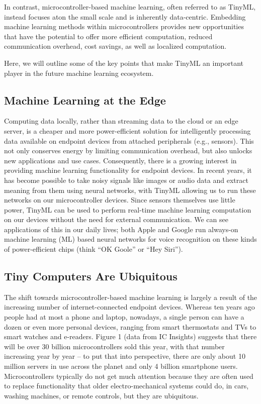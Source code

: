 In contrast, microcontroller-based machine learning, often referred to as TinyML, instead focuses aton the small scale and is inherently data-centric. Embedding machine learning methods within microcontrollers provides new opportunities that have the potential to offer more efficient computation, reduced communication overhead, cost savings, as well as localized computation. 

Here, we will outline some of the key points that make TinyML an important player in the future machine learning ecosystem.

\subsection{Machine Learning at the Edge}

Computing data locally, rather than streaming data to the cloud or an edge server, is a cheaper and more power-efficient solution for intelligently processing data available on endpoint devices from attached peripherals (e.g., sensors). This not only conserves energy by limiting communication overhead, but also unlocks new applications and use cases. Consequently, there is a growing interest in providing machine learning functionality for endpoint devices. In recent years, it has become possible to take noisy signals like images or audio data and extract meaning from them using neural networks, with TinyML allowing us to run these networks on our microcontroller devices. Since sensors themselves use little power, TinyML can be used to perform real-time machine learning computation on our devices without the need for external communication. We can see applications of this in our daily lives; both Apple and Google run always-on machine learning (ML) based neural networks for voice recognition on these kinds of power-efficient chips (think “OK Goole” or “Hey Siri”).

\subsection{Tiny Computers Are Ubiquitous}


The shift towards microcontroller-based machine learning is largely a result of the increasing number of internet-connected endpoint devices. Whereas ten years ago people had at most a phone and laptop, nowadays, a single person can have a dozen or even more personal devices, ranging from smart thermostats and TVs to smart watches and e-readers. Figure 1 (data from IC Insights) suggests that there will be over 30 billion microcontrollers sold this year, with that number increasing year by year -- to put that into perspective, there are only about 10 million servers in use across the planet and only 4 billion smartphone users. Microcontrollers typically do not get much attention because they are often used to replace functionality that older electro-mechanical systems could do, in cars, washing machines, or remote controls, but they are ubiquitous.

